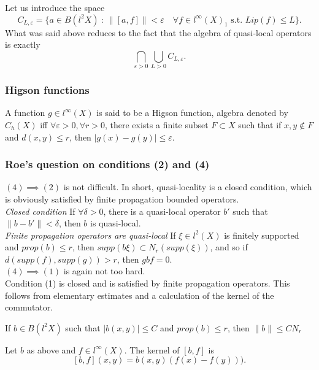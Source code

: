 Let us introduce the space 
\[C_{L,\varepsilon} = \{ a \in B(l^2 X) \ : \ \| [a,f] \| < \varepsilon \quad \forall f\in l^\infty(X)_1 \text{ s.t. } Lip(f)\leq L \}.\]
What was said above reduces to the fact that the algebra of quasi-local operators is exactly
\[\bigcap_{\varepsilon > 0} \bigcup_{L>0} C_{L,\varepsilon}.\]

\subsubsection*{Higson functions} A function $g\in l^\infty (X)$ is said to be a Higson function, algebra denoted by $C_h(X)$ iff
$\forall \varepsilon > 0, \forall  r > 0$,  there exists a finite subset $F\subset X$ such that if $x,y \notin F$ and $d(x,y)\leq r$, 
then $|g(x)-g(y)|\leq \varepsilon$.

\subsubsection{Roe's question on conditions (2) and (4)}
$(4)\implies (2)$ is not difficult. In short, quasi-locality is a closed condition, which is obviously satisfied by finite propagation bounded operators. \\

\textit{Closed condition} If $\forall \delta> 0 $, there is a quasi-local operator $b'$ such that $\| b - b' \| < \delta $, then $b$ is quasi-local.\\

\textit{Finite propagation operators are quasi-local} If $\xi \in l^2(X)$ is finitely supported and $prop(b)\leq r$, then $supp( b\xi ) \subset N_r( supp(\xi))$, and so if $d(supp(f), supp(g))> r$, then $gbf = 0$.\\

$(4)\implies (1)$ is again not too hard. \\
Condition (1) is closed and is satisfied by finite propagation operators. This follows from elementary estimates and a calculation of the kernel of the commutator.
\begin{lem}
If $b\in B(l^2X)$ such that $|b(x,y)|\leq C$ and $prop(b)\leq r$, then $\| b \| \leq C N_r$
\end{lem}

\begin{lem} Let $b$ as above and $f\in l^\infty(X) $. The kernel of $[b,f]$ is 
\[[b,f](x,y) = b(x,y) (f(x)-f(y))).\]
\end{lem}

